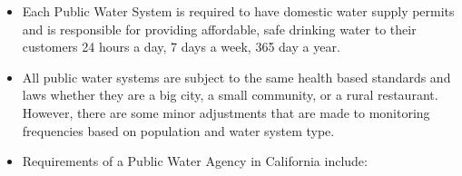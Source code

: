 \begin{itemize}
\item Each Public Water System is required to have domestic water supply permits and is responsible for providing affordable, safe drinking water to their customers 24 hours a day, 7 days a week, 365 day a year.

\item All public water systems are subject to the same health based standards and laws whether they are a big city, a small community, or a rural restaurant. However, there are some minor adjustments that are made to monitoring frequencies based on population and water system type.

\item Requirements of a Public Water Agency in California include:

\begin{itemize}


\end{itemize}
\end{itemize}
